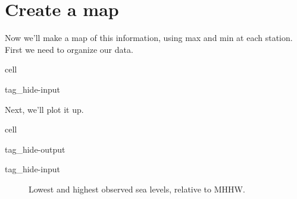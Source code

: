 \documentclass[letterpaper,10pt,english]{jupyterBook}
\begin{document}
\part{Create a map}
\label{\detokenize{notebooks/regional_and_local/SL_Rankings_annual:create-a-map}}\label{\detokenize{notebooks/regional_and_local/SL_Rankings_annual:sl-rankings-map}}
\sphinxAtStartPar
Now we’ll make a map of this information, using max and min at each station. First we need to organize our data.

\begin{sphinxuseclass}{cell}
\begin{sphinxuseclass}{tag_hide-input}
\end{sphinxuseclass}
\end{sphinxuseclass}
\sphinxAtStartPar
Next, we’ll plot it up.

\begin{sphinxuseclass}{cell}
\begin{sphinxuseclass}{tag_hide-output}
\begin{sphinxuseclass}{tag_hide-input}
\end{sphinxuseclass}
\end{sphinxuseclass}
\end{sphinxuseclass}
\begin{figure}[htbp]
\centering
\capstart

\noindent{}
\caption{Lowest and highest observed sea levels, relative to MHHW.}\label{\detokenize{notebooks/regional_and_local/SL_Rankings_annual:id1}}\end{figure}







\renewcommand{\indexname}{Index}
\printindex
\end{document}
